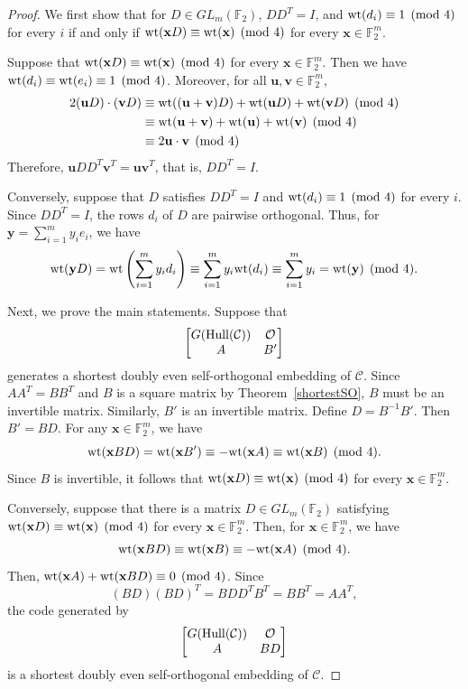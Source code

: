 \documentclass{article}
\theoremstyle{definition}
\theoremstyle{remark}
\begin{document}
\begin{proof}
We first show that for $D\in GL_{m}(\mathbb{F}_2)$, $DD^T=I$, and ${\rm wt}(d_i)\equiv 1\pmod 4$ for every $i$ if and only if ${\rm wt}(\mathbf{x}D)\equiv {\rm wt}(\mathbf{x})\pmod 4$ for every $\mathbf{x}\in\mathbb{F}_2^m$.

Suppose that ${\rm wt}(\mathbf{x}D)\equiv {\rm wt}(\mathbf{x})\pmod 4$ for every $\mathbf{x}\in\mathbb{F}_2^m$. Then we have ${\rm wt}(d_i)\equiv {\rm wt}(e_i)\equiv 1\pmod 4$. Moreover, for all $\mathbf{u}, \mathbf{v}\in\mathbb{F}_2^m$,
\begin{align*}
2(\mathbf{u}D)\cdot(\mathbf{v}D)&\equiv{\rm wt}((\mathbf{u}+\mathbf{v})D)+{\rm wt}(\mathbf{u}D)+{\rm wt}(\mathbf{v}D)\pmod 4\\&\equiv {\rm wt}(\mathbf{u}+\mathbf{v})+{\rm wt}(\mathbf{u})+{\rm wt}(\mathbf{v})\pmod 4\\&\equiv 2\mathbf{u}\cdot\mathbf{v} \pmod 4
\end{align*}
Therefore, $\mathbf{u}DD^T\mathbf{v}^T=\mathbf{u}\mathbf{v}^T$, that is, $DD^T=I$.

Conversely, suppose that $D$ satisfies $DD^T=I$ and ${\rm wt}(d_i)\equiv 1\pmod 4$ for every $i$. Since $DD^T=I$, the rows $d_i$ of $D$ are pairwise orthogonal. Thus, for $\mathbf{y}=\sum_{i=1}^m y_ie_i$, we have
\[
{\rm wt}(\mathbf{y}D)={\rm wt}\left(\sum_{i=1}^m y_id_i\right)\equiv \sum_{i=1}^my_i{\rm wt}(d_i)\equiv\sum_{i=1}^my_i={\rm wt}(\mathbf{y})\pmod 4.
\]

Next, we prove the main statements. Suppose that
    \[
    \begin{bmatrix}
       G({\rm Hull}(\mathcal{C})) & \mathcal{O}\\A & B'
    \end{bmatrix}
    \]
    generates a shortest doubly even self-orthogonal embedding of $\mathcal{C}$. Since $AA^T=BB^T$ and $B$ is a square matrix by Theorem~\ref{shortestSO}, $B$ must be an invertible matrix. Similarly, $B'$ is an invertible matrix. Define $D=B^{-1}B'$. Then $B'=BD$. For any $\mathbf{x}\in\mathbb{F}_2^m$, we have
    \[
    {\rm wt}(\mathbf{x}BD)={\rm wt}(\mathbf{x}B')\equiv -{\rm wt}(\mathbf{x}A) \equiv {\rm wt}(\mathbf{x}B) \pmod 4.
    \]
    Since $B$ is invertible, it follows that ${\rm wt}(\mathbf{x}D)\equiv {\rm wt}(\mathbf{x})\pmod 4$ for every $\mathbf{x}\in\mathbb{F}_2^m$.

    Conversely, suppose that there is a matrix $D\in GL_{m}(\mathbb{F}_2)$ satisfying ${\rm wt}(\mathbf{x}D)\equiv {\rm wt}(\mathbf{x})\pmod 4$ for every $\mathbf{x}\in\mathbb{F}_2^m$. Then, for $\mathbf{x}\in\mathbb{F}_2^m$, we have
    \[
    {\rm wt}(\mathbf{x}BD)\equiv{\rm wt}(\mathbf{x}B)\equiv -{\rm wt}(\mathbf{x}A)\pmod 4.
    \]
    Then, ${\rm wt}(\mathbf{x}A)+{\rm wt}(\mathbf{x}BD)\equiv 0\pmod 4$. Since
    \[
    (BD)(BD)^T=BDD^TB^T=BB^T=AA^T,
    \]
    the code generated by
    \[
    \begin{bmatrix}
    G({\rm Hull}(\mathcal{C})) & \mathcal{O}\\A & BD
    \end{bmatrix}
    \]
    is a shortest doubly even self-orthogonal embedding of $\mathcal{C}$.
\end{proof}
\end{document}
